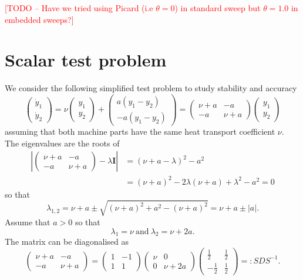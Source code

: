 \documentclass{article}
\newcommand{\ve}[1]{\mathbf{#1}}
\newcommand{\todo}[1]{\textcolor{red}{[TODO -- #1]}}
\begin{document}
\todo{Have we tried using Picard (i.e $\theta=0$) in standard sweep but $\theta = 1.0$ in embedded sweeps?}

\section*{Scalar test problem}
We consider the following simplified test problem to study stability and accuracy
\begin{equation}
	\begin{pmatrix} \dot{y}_1 \\ \dot{y}_2 \end{pmatrix} = \nu \begin{pmatrix} y_1 \\ y_2 \end{pmatrix} + \begin{pmatrix} a \left( y_1 - y_2 \right) \\ -a (y_1 - y_2) \end{pmatrix}
		= \begin{pmatrix}  \nu + a & -a \\ -a & \nu  +a \end{pmatrix} \begin{pmatrix} y_1 \\ y_2 \end{pmatrix}
\end{equation}
assuming that both machine parts have the same heat transport coefficient $\nu$.
The eigenvalues are the roots of
\begin{align*}
	\left| \begin{pmatrix}  \nu + a & -a \\ -a & \nu  +a \end{pmatrix} - \lambda \ve{I} \right| &= \left( \nu + a - \lambda \right)^2 - a^2 \\
	&= \left( \nu + a \right)^2 - 2 \lambda \left( \nu + a \right) + \lambda^2 - a^2 = 0
\end{align*}
so that
\begin{equation}
	\lambda_{1,2} = \nu + a \pm \sqrt{ \left(\nu+a\right)^2 + a^2 - \left( \nu + a \right)^2 } = \nu + a \pm \left| a \right|.
\end{equation}
Assume that $a > 0$ so that
\begin{equation}
	\lambda_1 = \nu \ \text{and} \ \lambda_2 = \nu + 2 a.
\end{equation}
The matrix can be diagonalised as
\begin{equation}
	\begin{pmatrix} \nu+a & -a \\ -a & \nu + a \end{pmatrix} = \begin{pmatrix} 1 & -1 \\ 1 & 1 \end{pmatrix} \begin{pmatrix} \nu & 0 \\ 0 & \nu + 2 a \end{pmatrix} \begin{pmatrix} \frac{1}{2} & \frac{1}{2} \\ -\frac{1}{2} & \frac{1}{2} \end{pmatrix} =: S D S^{-1}.
\end{equation}
\end{document}
